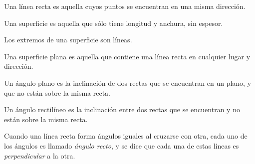 \documentclass[booklanguage=english]{byrnebook}
\begin{document}
\startdefinition{}\label{def:I.IV}
\begin{center}
Una línea recta es aquella cuyos puntos se encuentran en una misma dirección.
\end{center}

\startdefinition{}\label{def:I.V}
\begin{center}
Una superficie es aquella que sólo tiene longitud y anchura, sin espesor.
\end{center}

\startdefinition{}\label{def:I.VI}
\begin{center}
Los extremos de una superficie son líneas.
\end{center}

\startdefinition{}\label{def:I.VII}
\begin{center}
Una superficie plana es aquella que contiene una línea recta en cualquier lugar y dirección.
\end{center}

\startdefinition{}\label{def:I.VIII}
\begin{center}
Un ángulo plano es la inclinación de dos rectas que se encuentran en un plano, y que no están sobre la misma recta.
\end{center}

\startdefinition{}\label{def:I.IX}
\begin{center}
\drawCurrentPictureInMargin Un ángulo rectilíneo es la inclinación entre dos rectas que se encuentran y no están sobre la misma recta.
\end{center}
	
\startdefinition{}\label{def:I.X}
\begin{center}
\drawCurrentPictureInMargin Cuando una línea recta forma ángulos iguales al cruzarse con otra, cada uno de los ángulos es llamado \emph{ángulo recto}, y se dice que cada una de estas líneas es \emph{perpendicular} a la otra.
\end{center}
\end{document}
